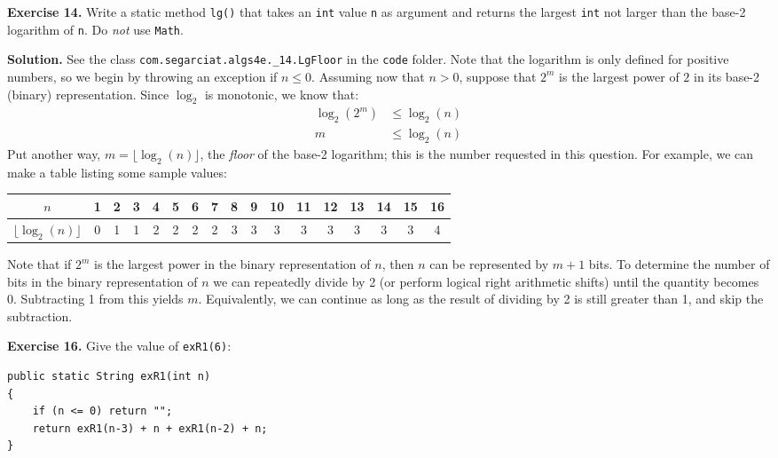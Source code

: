 \documentclass[12pt, a4paper]{article}
\newenvironment{ex}[2][Exercise]
{\par\medskip\noindent \textbf{#1 #2.}}
{\medskip}
\newenvironment{sol}[1][Solution]
{\par\medskip\noindent \textbf{#1.} }
{\medskip}
\begin{document}
	\begin{ex}{14}
		Write a static method \texttt{lg()} that takes an \texttt{int} value \texttt{n}
		as argument and returns the largest \texttt{int} not larger than the base-2 logarithm
		of \texttt{n}. Do \emph{not} use \texttt{Math}.
	\end{ex}
	\begin{sol}
		See the class \texttt{com.segarciat.algs4e.\_14.LgFloor} in the \texttt{code} folder.
		Note that the logarithm is only defined for positive numbers,
		so we begin by throwing an exception if $n \leq 0$. Assuming now that
		$n > 0$, suppose that $2^m$ is the largest power of $2$ in its base-2 (binary)
		representation. Since $\log_2$ is monotonic, we know that:
		\begin{align*}
			\log_2(2^m)&\leq \log_2(n)\\
			m&\leq  \log_2(n)
		\end{align*}
		Put another way, $m = \lfloor \log_2(n)\rfloor$, the \emph{floor} of the base-2
		logarithm; this is the number requested in this question. For example, we can
		make a table listing some sample values:
		\begin{center}
			\begin{tabular}{c|cccccccccccccccc}
				$n$ & 1 & 2 & 3 & 4 & 5 & 6 & 7 & 8 & 9 & 10 & 11 & 12 & 13 & 14 & 15 & 16\\
				\hline
				$\lfloor \log_2(n)\rfloor$ & 0 & 1 & 1 & 2 & 2 & 2 & 2 & 3 & 3 & 3 & 3 & 3 & 3
				& 3 & 3 & 4
			\end{tabular}
		\end{center}
		Note that if $2^m$ is the largest power in the binary representation of $n$, then
		$n$ can be represented by $m + 1$ bits. To determine the number of bits in the
		binary representation of $n$ we can repeatedly divide by 2 (or perform logical right
		arithmetic shifts) until the quantity becomes 0. Subtracting 1 from this yields
		$m$. Equivalently, we can continue as long as the result of dividing by 2 is still
		greater than 1, and skip the subtraction.
	\end{sol}
	\begin{ex}{16}
		Give the value of \texttt{exR1(6)}:
		\begin{lstlisting}
public static String exR1(int n)
{
	if (n <= 0) return "";
	return exR1(n-3) + n + exR1(n-2) + n;
}
		\end{lstlisting}
	\end{ex}
\end{document}
